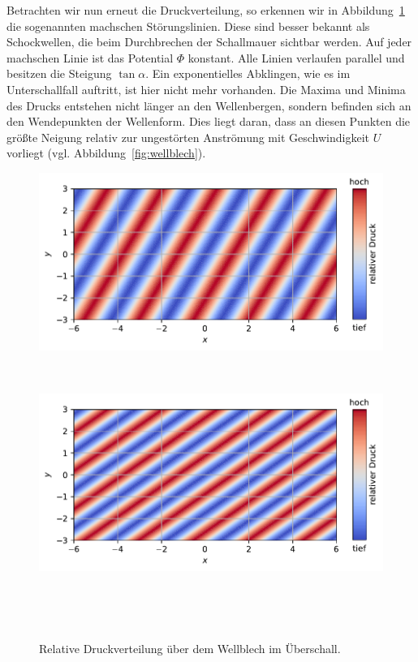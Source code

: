 Betrachten wir nun erneut die Druckverteilung, so erkennen wir in 
Abbildung~\ref{fig:druckvert_ueberschall} die sogenannten machschen Störungslinien. 
Diese sind besser bekannt als Schockwellen, 
die beim Durchbrechen der Schallmauer sichtbar werden. 
Auf jeder machschen Linie ist das Potential \(\Phi\) konstant. 
Alle Linien verlaufen parallel und besitzen die Steigung \(\tan \alpha\).
Ein exponentielles Abklingen, wie es im Unterschallfall auftritt, 
ist hier nicht mehr vorhanden. 
Die Maxima und Minima des Drucks entstehen nicht länger an den Wellenbergen, 
sondern befinden sich an den Wendepunkten der Wellenform. 
Dies liegt daran, dass an diesen Punkten die größte Neigung relativ zur 
ungestörten Anströmung mit Geschwindigkeit \(U\) vorliegt 
(vgl. Abbildung~\ref{fig:wellblech}).
\begin{figure}
    \centering
    \begin{minipage}[b]{\textwidth}
        \centering
        \includegraphics[width=\linewidth]{papers/ueberschall/figures/druck_mach_kegel_400.pdf}
        \caption*{$U = 400 \frac{\mathrm{m}}{\mathrm{s}}$}
        ~\label{fig:druckvert_ueberschall_u400}
    \end{minipage}
    \hfill
    \begin{minipage}[b]{\textwidth}
        \centering
        \includegraphics[width=\linewidth]{papers/ueberschall/figures/druck_mach_kegel_600.pdf}
        \caption*{$U = 600 \frac{\mathrm{m}}{\mathrm{s}}$}
        ~\label{fig:druckvert_ueberschall_u600}
    \end{minipage}
    \caption{Relative Druckverteilung über dem Wellblech im Überschall.}
~\label{fig:druckvert_ueberschall}
\end{figure}